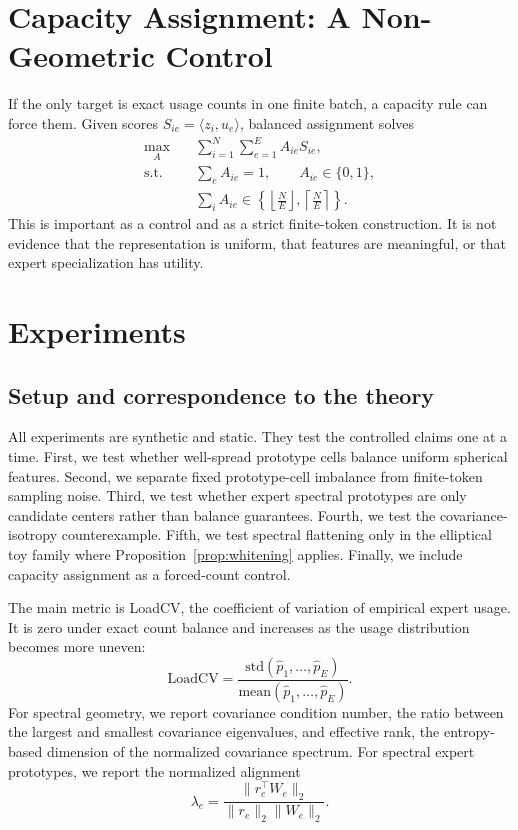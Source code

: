 \documentclass{article}
\begin{document}
\section{Capacity Assignment: A Non-Geometric Control}

If the only target is exact usage counts in one finite batch, a capacity rule can
force them.  Given scores $S_{ie}=\langle z_i,u_e\rangle$, balanced assignment
solves
\begin{align}
 \max_A \quad & \sum_{i=1}^N\sum_{e=1}^E A_{ie}S_{ie}, \\
 \text{s.t.}\quad & \sum_e A_{ie}=1,\qquad A_{ie}\in\{0,1\},\\
 & \sum_i A_{ie}\in
 \left\{\left\lfloor\frac{N}{E}\right\rfloor,
 \left\lceil\frac{N}{E}\right\rceil\right\}.
\end{align}
This is important as a control and as a strict finite-token construction.  It is
not evidence that the representation is uniform, that features are meaningful,
or that expert specialization has utility.

\section{Experiments}

\subsection{Setup and correspondence to the theory}

All experiments are synthetic and static.  They test the controlled claims one
at a time.  First, we test whether well-spread prototype cells balance uniform
spherical features.  Second, we separate fixed prototype-cell imbalance from
finite-token sampling noise.  Third, we test whether expert spectral prototypes
are only candidate centers rather than balance guarantees.  Fourth, we test the
covariance-isotropy counterexample.  Fifth, we test spectral flattening only in
the elliptical toy family where Proposition~\ref{prop:whitening} applies.
Finally, we include capacity assignment as a forced-count control.

The main metric is LoadCV, the coefficient of variation of empirical expert
usage.  It is zero under exact count balance and increases as the usage
distribution becomes more uneven:
\begin{equation}
 \mathrm{LoadCV}=\frac{\mathrm{std}(\widehat p_1,\ldots,\widehat p_E)}
 {\mathrm{mean}(\widehat p_1,\ldots,\widehat p_E)}.
\end{equation}
For spectral geometry, we report covariance condition number, the ratio between
the largest and smallest covariance eigenvalues, and effective rank, the
entropy-based dimension of the normalized covariance spectrum.  For spectral
expert prototypes, we report the normalized alignment
\begin{equation}
 \lambda_e=\frac{\|r_e^\top W_e\|_2}{\|r_e\|_2\|W_e\|_2}.
\end{equation}
\end{document}
